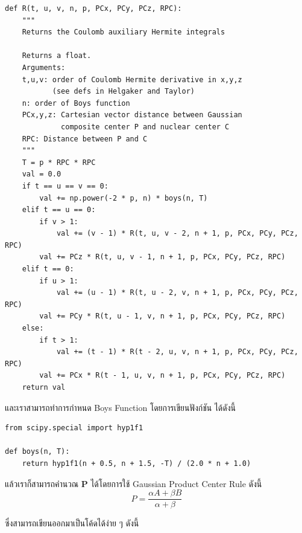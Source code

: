 \vspace{5pt}

\begin{lstlisting}[style=MyPython]
def R(t, u, v, n, p, PCx, PCy, PCz, RPC):
    """
    Returns the Coulomb auxiliary Hermite integrals

    Returns a float.
    Arguments:
    t,u,v: order of Coulomb Hermite derivative in x,y,z
           (see defs in Helgaker and Taylor)
    n: order of Boys function
    PCx,y,z: Cartesian vector distance between Gaussian
             composite center P and nuclear center C
    RPC: Distance between P and C
    """
    T = p * RPC * RPC
    val = 0.0
    if t == u == v == 0:
        val += np.power(-2 * p, n) * boys(n, T)
    elif t == u == 0:
        if v > 1:
            val += (v - 1) * R(t, u, v - 2, n + 1, p, PCx, PCy, PCz, RPC)
        val += PCz * R(t, u, v - 1, n + 1, p, PCx, PCy, PCz, RPC)
    elif t == 0:
        if u > 1:
            val += (u - 1) * R(t, u - 2, v, n + 1, p, PCx, PCy, PCz, RPC)
        val += PCy * R(t, u - 1, v, n + 1, p, PCx, PCy, PCz, RPC)
    else:
        if t > 1:
            val += (t - 1) * R(t - 2, u, v, n + 1, p, PCx, PCy, PCz, RPC)
        val += PCx * R(t - 1, u, v, n + 1, p, PCx, PCy, PCz, RPC)
    return val
\end{lstlisting}

\vspace{5pt}

\noindent และเราสามารถทำการกำหนด Boys Function โดยการเขียนฟังก์ชัน  ได้ดังนี้

\vspace{5pt}

\begin{lstlisting}[style=MyPython]
from scipy.special import hyp1f1

def boys(n, T):
    return hyp1f1(n + 0.5, n + 1.5, -T) / (2.0 * n + 1.0)
\end{lstlisting}

\vspace{5pt}

\noindent แล้วเราก็สามารถคำนวณ $\mathbf{P}$ ได้โดยการใช้ Gaussian Product Center Rule ดังนี้
%
\begin{equation}
  P
  =
  \frac{\alpha A + \beta B}{\alpha + \beta}
\end{equation}

\noindent ซึ่งสามารถเขียนออกมาเป็นโค้ดได้ง่าย ๆ ดังนี้

\vspace{5pt}

